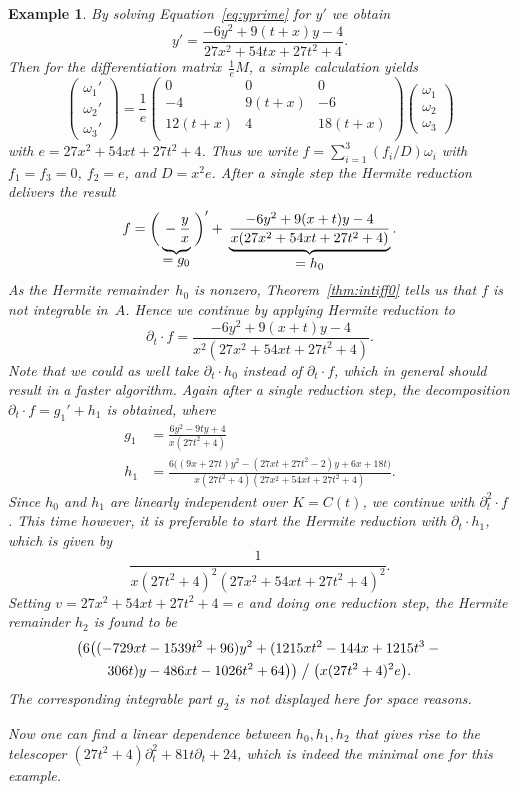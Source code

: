 \documentclass{sig-alternate-05-2015}
\newtheorem{example}[theorem]{Example}
\begin{document}
\begin{example}
By solving Equation~\eqref{eq:yprime} for $y'$ we obtain
\[
  y' = \frac{-6y^2 + 9(t+x)y - 4}{27x^2+54tx+27t^2+4}.
\]
Then for the differentiation matrix~$\frac1eM$, a simple calculation yields
\[
  \begin{pmatrix} \omega_1' \\[1pt] \omega_2' \\[1pt] \omega_3' \end{pmatrix} =
  \frac{1}{e} \begin{pmatrix} 0 & 0 & 0 \\[1pt] -4 & 9 (t+x) & -6 \\[1pt] 12 (t+x) & 4 & 18 (t+x) \\ \end{pmatrix}
  \begin{pmatrix} \omega_1 \\[1pt] \omega_2 \\[1pt] \omega_3 \end{pmatrix}
\]
with $e=27x^2+54xt+27t^2+4$. Thus we write $f=\sum_{i=1}^3 (f_i/D) \omega_i$ with
$f_1=f_3=0$, $f_2=e$, and $D=x^2e$.  After a single step the Hermite reduction
delivers the result
\[
  f = \biggl(\, \underbrace{\vphantom{\frac{1}{(x)}} -\frac{y}{x}}_{\textstyle=g_0} \;\biggr)' +\>
  \underbrace{\frac{-6y^2+9(x+t)y-4}{x(27x^2+54xt+27t^2+4)}}_{\textstyle=h_0}.
\]
As the Hermite remainder~$h_0$ is nonzero, Theorem~\ref{thm:intiff0} tells us that
$f$ is not integrable in~$A$. Hence we continue by applying Hermite reduction to
\[
  \partial_t\cdot f = \frac{-6y^2+9(x+t)y-4}{x^2(27x^2+54xt+27t^2+4)}.
\]
Note that we could as well take $\partial_t\cdot h_0$ instead of $\partial_t\cdot f$, which
in general should result in a faster algorithm.
Again after a single reduction step, the decomposition $\partial_t\cdot f = g_1' + h_1$
is obtained, where
\begin{align*}
  g_1 &= \frac{6y^2-9ty+4}{x(27t^2+4)} \\
  h_1 &= \frac{6\bigl((9x+27t)y^2-(27xt+27t^2-2)y+6x+18t\bigr)}{x(27t^2+4)(27x^2+54xt+27t^2+4)}.
\end{align*}
Since $h_0$ and $h_1$ are linearly independent over $K=C(t)$, we continue with
$\partial_t^2\cdot f$.
This time however, it is preferable to start the Hermite reduction
with $\partial_t\cdot h_1$, which is given by
\[
  \frac{1}{x(27t^2+4)^2(27x^2+54xt+27t^2+4)^2}.
\]
Setting $v=27x^2+54xt+27t^2+4=e$ and doing one reduction step,
the Hermite remainder $h_2$ is found to be
\begin{multline*}
 \bigl(6\bigl((-729xt-1539t^2+96)y^2+(1215xt^2-144x+1215t^3-{}\\
 306t)y-486xt-1026t^2+64\bigr)\bigr)\mathrel{\big\slash}\bigl(x(27t^2+4)^2e\bigr).
\end{multline*}
The corresponding integrable part $g_2$ is not displayed here for space reasons.

Now one can find a linear dependence between $h_0,h_1,h_2$ that gives rise to the telescoper
$(27t^2+4)\partial_t^2+81t\partial_t+24$, which is indeed the minimal one for this example.
\end{example}
\end{document}
